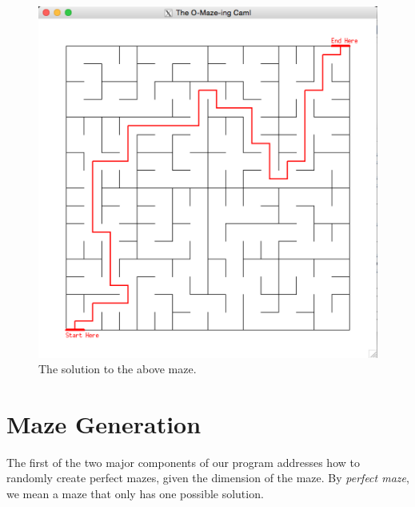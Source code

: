 \documentclass[11pt, margin=1in]{article}
\begin{document}
\begin{figure}[H]
\begin{center}
\includegraphics[scale=0.3]{solution.jpg}
\caption{The solution to the above maze.}
\end{center}
\end{figure}





    

\section{Maze Generation}

The first of the two major components of our program addresses how to randomly create perfect mazes, given the dimension of the maze. By \emph{perfect maze}, we mean a maze that only has one possible solution.    
\end{document}
